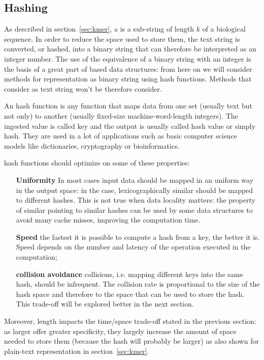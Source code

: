 \subsection{Hashing \kmers}
As described in section~\ref{sec:kmer}, a \kmer is a sub-string of length $k$ of a biological sequence. In order to reduce the space used to store them, the text string is converted, or hashed, into a binary string that can therefore be interpreted as an integer number. The use of the equivalence of a binary string with an integer is the basis of a great part of \kmer based data structures: from here on we will consider methods for \kmers representation as binary string using hash functions. Methods that consider \kmer as text string won't be therefore consider.
\begin{description}
	\item An hash function is any function that maps data from one set (usually text but not only) to another (usually fixed-size machine-word-length integers). The ingested value is called key and the output is usually called hash value or simply hash. They are used in a lot of applications such as basic computer science models like dictionaries, cryptography or bioinformatics.
	\item hash functions should optimize on some of these properties:
	\begin{itemize}
		\item[\textbf{Uniformity}] In most cases input data should be mapped in an uniform way in the output space: in the \kmer case, lexicographically similar \kmers should be mapped to different hashes. This is not true when data locality matters: the property of similar \kmers pointing to similar hashes can be used by some data structures to avoid many cache misses, improving the computation time.
		\item[\textbf{Speed}] the fastest it is possible to compute a hash from a key, the better it is. Speed depends on the number and latency of the operation executed in the computation;
		\item[\textbf{collision avoidance}] collisions, i.e. mapping different keys into the same hash, should be infrequent. The collision rate is proportional to the size of the hash space and therefore to the space that can be used to store the hash. This trade-off will be explored better in the next section.
	\end{itemize}
\end{description}
Moreover, \kmer length impacts the time/space trade-off stated in the previous section: as larger \kmer offer greater specificity, they largely increase the amount of space needed to store them (because the hash will probably be larger) as also shown for plain-text representation in section~\ref{sec:kmer}.

